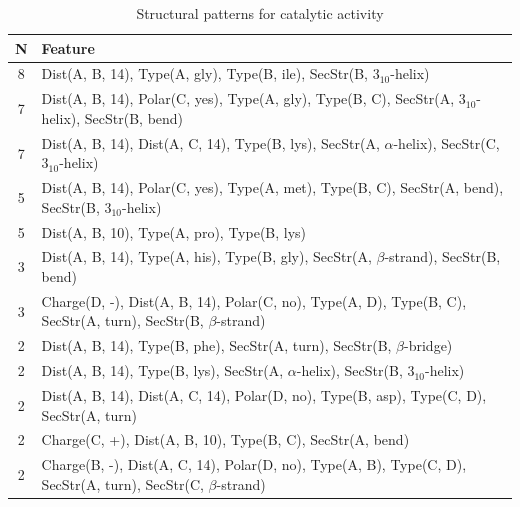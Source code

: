 \documentclass[11pt,twoside,a4paper]{book}
\begin{document}
\begin{table}[h]\begin{tabularx}{\textwidth}{cX}\textbf{N} & \textbf{Feature} \\ \hline  
8 & Dist(A, B, 14),  Type(A, gly), Type(B, ile), SecStr(B, $3_{10}$-helix)\\ \hline 
7 & Dist(A, B, 14), Polar(C, yes),  Type(A, gly), Type(B, C), SecStr(A, $3_{10}$-helix), \newline SecStr(B, bend)\\ \hline 
7 & Dist(A, B, 14), Dist(A, C, 14),  Type(B, lys), SecStr(A, $\alpha$-helix), SecStr(C, $3_{10}$-helix)\\ \hline 
5 & Dist(A, B, 14), Polar(C, yes),  Type(A, met), Type(B, C), SecStr(A, bend), \newline SecStr(B, $3_{10}$-helix)\\ \hline 
5 & Dist(A, B, 10),  Type(A, pro), Type(B, lys)\\ \hline 
3 & Dist(A, B, 14),  Type(A, his), Type(B, gly), SecStr(A, $\beta$-strand), SecStr(B, bend)\\ \hline 
3 & Charge(D, -), Dist(A, B, 14), Polar(C, no),  Type(A, D), Type(B, C), SecStr(A, turn), SecStr(B, $\beta$-strand)\\ \hline 
2 & Dist(A, B, 14),  Type(B, phe), SecStr(A, turn), SecStr(B, $\beta$-bridge)\\ \hline 
2 & Dist(A, B, 14),  Type(B, lys), SecStr(A, $\alpha$-helix), SecStr(B, $3_{10}$-helix)\\ \hline 
2 & Dist(A, B, 14), Dist(A, C, 14), Polar(D, no),  Type(B, asp), Type(C, D), \newline SecStr(A, turn)\\ \hline 
2 & Charge(C, +), Dist(A, B, 10),  Type(B, C), SecStr(A, bend)\\ \hline 
2 & Charge(B, -), Dist(A, C, 14), Polar(D, no),  Type(A, B), Type(C, D), SecStr(A, turn), SecStr(C, $\beta$-strand)\\ \hline 
 \end{tabularx}\caption{Structural patterns for catalytic activity}\label{tab:catalytic_activity}\end{table}
\end{document}
